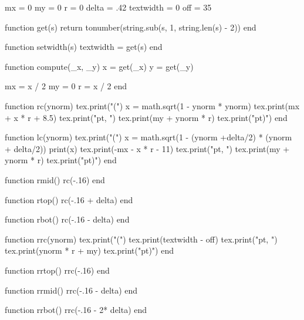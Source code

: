 \basicheader
\usepackage{ifthen,etoolbox}
\usepackage{colortbl}
\usepackage{longtable}
\usepackage{luacode}

\begin{luacode}
    mx = 0
    my = 0
    r = 0
    delta = .42
    textwidth = 0
    off = 35

    function get(s)
        return tonumber(string.sub(s, 1, string.len(s) - 2))
    end

    function setwidth(s)
        textwidth = get(s)
    end

    function compute(_x, _y)
        x = get(_x)
        y = get(_y)

        mx = x / 2
        my = 0
        r = x / 2
    end

    function rc(ynorm)
        tex.print("(")
        x = math.sqrt(1 - ynorm * ynorm)
        tex.print(mx + x * r + 8.5)
        tex.print("pt, ")
        tex.print(my + ynorm * r)
        tex.print("pt)")
    end

    function lc(ynorm)
        tex.print("(")
        x = math.sqrt(1 - (ynorm  +delta/2) * (ynorm + delta/2))
        print(x)
        tex.print(-mx - x * r - 11)
        tex.print("pt, ")
        tex.print(my + ynorm * r)
        tex.print("pt)")
    end

    function rmid()
        rc(-.16)
    end

    function rtop()
        rc(-.16 + delta)
    end

    function rbot()
        rc(-.16 - delta)
    end

    function rrc(ynorm)
        tex.print("(")
        tex.print(textwidth - off)
        tex.print("pt, ")
        tex.print(ynorm * r + my)
        tex.print("pt)")
    end

    function rrtop()
        rrc(-.16)
    end

    function rrmid()
        rrc(-.16 - delta)
    end

    function rrbot()
        rrc(-.16 - 2* delta)
    end
\end{luacode}

\setlength{\LTpost}{\medskipamount}

\usepackage[lining,scaled=.9]{FiraMono}
\usepackage[mathrm=sym]{unicode-math}
\usepackage[Scale=.9]{firamath-otf}
\usepackage{luatexbase}
\usepackage{microtype}
\usepackage[hang,symbol,multiple]{footmisc}
\usepackage{tikz}
\usepackage{siunitx}
\usepackage{xcolor}

